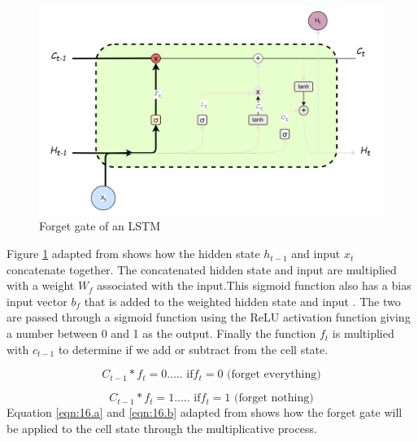 \begin{figure}[h]
	\centering
	\includegraphics[width=0.7\linewidth]{"Chapters/images/LSTM input gate"}
	\caption{Forget gate of an LSTM}
	\label{fig:forgetgate}
\end{figure}
Figure \ref{fig:forgetgate} adapted from \cite{colah2015understanding} shows how the hidden state $h_{t-1}$ and input $x_t$ concatenate together. The concatenated hidden state and input are multiplied with a weight $W_f$ associated with the input.This sigmoid function also has a bias input vector $b_f$ that is added to the weighted hidden state and input .  The two are passed through a sigmoid function using the ReLU activation function giving a number between 0 and 1 as the output. Finally the function $f_t$ is multiplied with $c_{t-1}$ to determine if we add or subtract from the cell state.

\[
C_{t-1}*f_t = 0   ..... \text{    if} f_t = 0 \text{           (forget everything)}
\tag{24.a}
\label{eqn:16.a}
\]

\[
C_{t-1}*f_t = 1  ..... \text{  if} f_t = 1 \text{            (forget nothing)}
\tag{24.b}
\label{eqn:16.b}
\]
 Equation \ref{eqn:16.a} and \ref{eqn:16.b} adapted from \cite{stryker_ibm_rnn} shows how the forget gate will be applied to the cell state through the multiplicative process.
 
 
